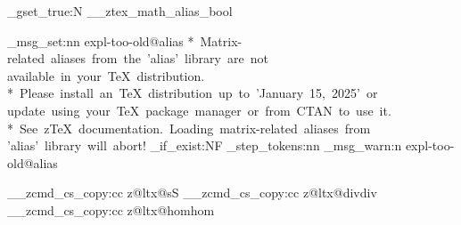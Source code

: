 

\bool_gset_true:N \g__ztex_math_alias_bool
\RequirePackage{amssymb, mathrsfs}
\RequirePackage{mathtools}


\ztex_msg_set:nn { expl-too-old@alias }
  {
    *~Matrix-related~aliases~from~the~'alias'~library~are~not~
    available~in~your~TeX~distribution. \\
    *~Please~install~an~TeX~distribution~up~to~'January~15,~2025'~or~
    update~using~your~TeX~package~manager~or~from~CTAN~to~use~it. \\
    *~See~zTeX~documentation.~Loading~matrix-related~aliases~from~
    'alias'~library~will~abort!
  }
\cs_if_exist:NF \int_step_tokens:nn
  {
    \ztex_msg_warn:n { expl-too-old@alias }
  }


\__zcmd_cs_copy:cc {z@ltx@s}{S}
\__zcmd_cs_copy:cc {z@ltx@div}{div}
\__zcmd_cs_copy:cc {z@ltx@hom}{hom}


